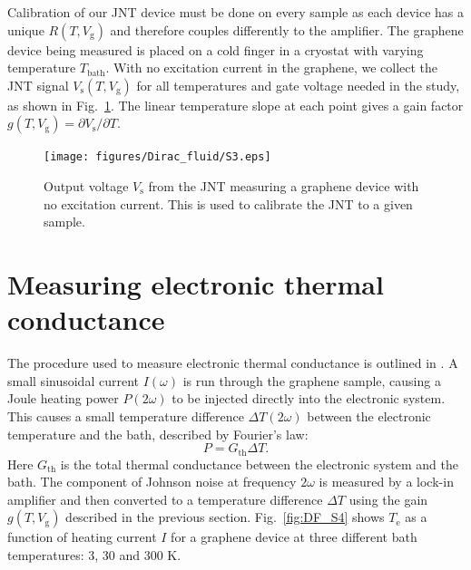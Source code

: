 Calibration of our JNT device must be done on every sample as each device has a unique $R(T,V_{\mathrm{g}})$ and therefore couples differently to the amplifier.  The graphene device being measured is placed on a cold finger in a cryostat with varying temperature $T_{\mathrm{bath}}$.  With no excitation current in the graphene, we collect the JNT signal $V_{\mathrm{s}}(T,V_{\mathrm{g}})$ for all temperatures and gate voltage needed in the study, as shown in Fig.~\ref{fig:DF_S3}.   The linear temperature slope at each point gives a gain factor $g(T,V_{\mathrm{g}}) = \partial V_{\mathrm{s}}/\partial T$.

 \begin{figure}
\texttt{[image: figures/Dirac\_fluid/S3.eps]}
\caption{Output voltage $V_{\mathrm{s}}$ from the JNT measuring a graphene device with no excitation current.  This is used to calibrate the JNT to a given sample.}
\label{fig:DF_S3}
\end{figure}


\section{Measuring electronic thermal conductance}

The procedure used to measure electronic thermal conductance is outlined in \cite{crossno_development_2015, fong_ultrasensitive_2012, santavicca_energy_2010}.  A small sinusoidal current $I(\omega)$ is run through the graphene sample, causing a Joule heating power $P(2\omega)$ to be injected directly into the electronic system.  This causes a small temperature difference $\Delta T(2\omega) $ between the electronic temperature and the bath, described by Fourier's law: \begin{equation}
P = G_{\mathrm{th}} \Delta T.   \label{eq:DF_eqp1}
\end{equation}
Here $G_{\mathrm{th}}$ is the total thermal conductance between the electronic system and the bath.  The component of Johnson noise at frequency $2\omega$  is measured by a lock-in amplifier and then converted to a temperature difference $\Delta T$ using the gain $g(T,V_{\mathrm{g}})$ described in the previous section.  Fig.~\ref{fig:DF_S4} shows $T_{\mathrm{e}}$ as a function of heating current $I$ for a graphene device at three different bath temperatures:  3, 30 and 300 K.

